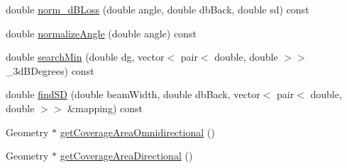 \begin{DoxyCompactItemize}
double \hyperlink{class_antenna_a8270b1a03b61af1e048650e00a129b93}{norm\+\_\+d\+B\+Loss} (double angle, double db\+Back, double sd) const
\item 
double \hyperlink{class_antenna_a353ae3aafbc75033c30fb96004c2b73f}{normalize\+Angle} (double angle) const
\item 
double \hyperlink{class_antenna_a48ef89b0d1bd313bae4ca863da1cc77e}{search\+Min} (double dg, vector$<$ pair$<$ double, double $>$$>$ \+\_\+3d\+B\+Degrees) const
\item 
double \hyperlink{class_antenna_affb34fcbb958e09bd48a2c3069e06ac8}{find\+SD} (double beam\+Width, double db\+Back, vector$<$ pair$<$ double, double $>$$>$ \&mapping) const
\item 
Geometry $\ast$ \hyperlink{class_antenna_adaca77948cf68db3348e2819264767f6}{get\+Coverage\+Area\+Omnidirectional} ()
\item 
Geometry $\ast$ \hyperlink{class_antenna_af5e3d353fcc340b963181514b55bf715}{get\+Coverage\+Area\+Directional} ()
\end{DoxyCompactItemize}
